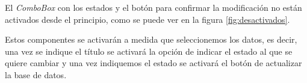 

El \emph{ComboBox} con los estados y el botón para confirmar la modificación no están activados desde el principio, como se puede ver en la figura \ref{fig:desactivados}.


Estos componentes se activarán a medida que seleccionemos los datos, es decir, una vez se indique el título se activará la opción de indicar el estado al que se quiere cambiar y una vez indiquemos el estado se activará el botón de actualizar la base de datos.



